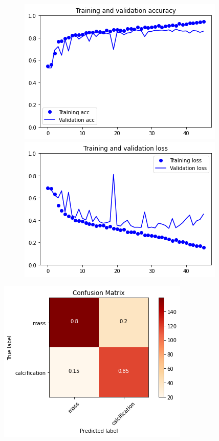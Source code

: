 \documentclass{article}
\begin{document}
\begin{figure}[h]
    \centering
    \begin{minipage}{0.45\textwidth}
        \centering
        \includegraphics[scale=0.46]{./img/scratchVal5.png}
    \end{minipage}\hfill
    \begin{minipage}{0.45\textwidth}
        \centering
        \includegraphics[scale=0.46]{./img/scratchLoss5.png}
    \end{minipage}
\end{figure}

\begin{center}
\begin{minipage}{0.45\textwidth}
        \includegraphics[scale=0.6]{./img/cmScratch5.png}
    \end{minipage}
\end{center}
\end{document}
